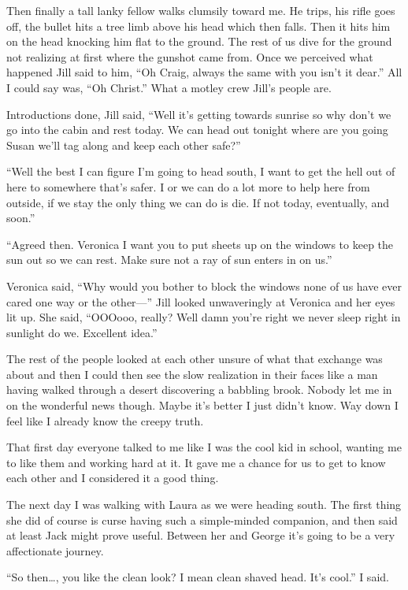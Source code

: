 Then finally a tall lanky fellow walks clumsily toward me. He trips, his rifle goes off, the bullet hits a tree limb above his head which then falls. Then it hits him on the head knocking him flat to the ground. The rest of us dive for the ground not realizing at first where the gunshot came from. Once we perceived what happened Jill said to him, ``Oh Craig, always the same with you isn't it dear.'' All I could say was, ``Oh Christ.'' What a motley crew Jill's people are.

Introductions done, Jill said, ``Well it's getting towards sunrise so why don't we go into the cabin and rest today. We can head out tonight where are you going Susan we'll tag along and keep each other safe?''

``Well the best I can figure I'm going to head south, I want to get the hell out of here to somewhere that's safer. I or we can do a lot more to help here from outside, if we stay the only thing we can do is die. If not today, eventually, and soon.''

``Agreed then. Veronica I want you to put sheets up on the windows to keep the sun out so we can rest. Make sure not a ray of sun enters in on us.''

Veronica said, ``Why would you bother to block the windows none of us have ever cared one way or the other---'' Jill looked unwaveringly at Veronica and her eyes lit up. She said, ``OOOooo, really? Well damn you're right we never sleep right in sunlight do we. Excellent idea.''

The rest of the people looked at each other unsure of what that exchange was about and then I could then see the slow realization in their faces like a man having walked through a desert discovering a babbling brook. Nobody let me in on the wonderful news though. Maybe it's better I just didn't know. Way down I feel like I already know the creepy truth.

That first day everyone talked to me like I was the cool kid in school, wanting me to like them and working hard at it. It gave me a chance for us to get to know each other and I considered it a good thing.

The next day I was walking with Laura as we were heading south. The first thing she did of course is curse having such a simple-minded companion, and then said at least Jack might prove useful. Between her and George it's going to be a very affectionate journey.

``So then\dots , you like the clean look? I mean clean shaved head. It's cool.'' I said.

